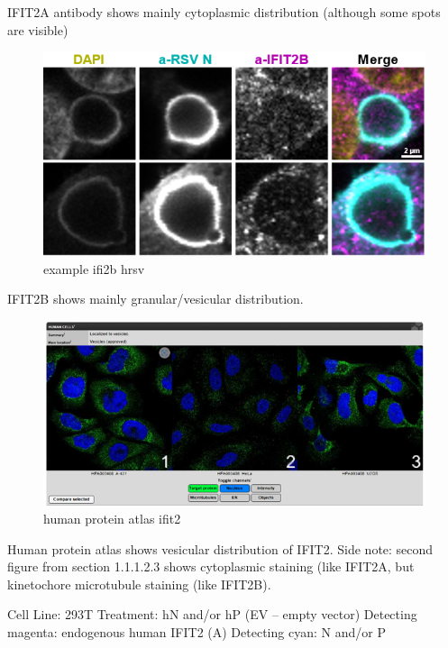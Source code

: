 IFIT2A antibody shows mainly cytoplasmic distribution (although some spots are visible)


\begin{figure}
    \centering
    \includegraphics[width=1\linewidth]{10. Chapter 5//Figs//02. I2B/03. i2b a549 hrsv n.png}
    \caption[example ifi2b hrsv]{example ifi2b hrsv}
    \label{fig:example ifi2b hrsv}
\end{figure}

IFIT2B shows mainly granular/vesicular distribution.

\begin{figure}
    \centering
    \includegraphics[width=1\linewidth]{10. Chapter 5//Figs//04. IFIT2AB Discussion/02. human protein atlas ifit2.png}
    \caption[human protein atlas ifit2]{human protein atlas ifit2}
    \label{fig:human protein atlas ifit2}
\end{figure}

Human protein atlas shows vesicular distribution of IFIT2.
Side note: second figure from section 1.1.1.2.3 shows cytoplasmic staining (like IFIT2A, but kinetochore microtubule staining (like IFIT2B).

 \label{P Transfection Induces IFIT2A Signal but not IFIT2B Signal}
Cell Line: 293T \newline
Treatment: hN and/or hP (EV – empty vector) \newline
Detecting magenta: endogenous human IFIT2 (A) \newline
Detecting cyan: N and/or P \newline

